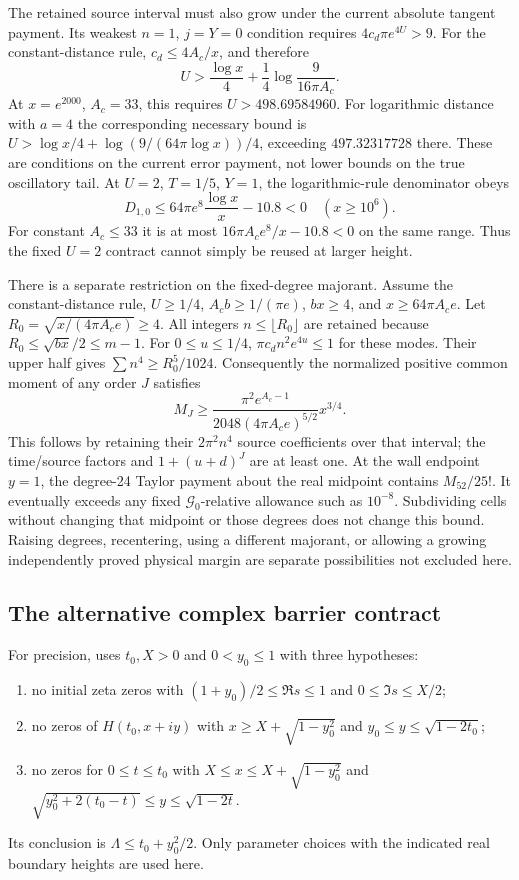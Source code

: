 The retained source interval must also grow under the current
absolute tangent payment. Its weakest $n=1$, $j=Y=0$ condition
requires $4c_d\pi e^{4U}>9$. For the constant-distance rule,
$c_d\le4A_c/x$, and therefore
\begin{equation}\label{eq:source-growth}
 U>\frac{\log x}{4}+
       \frac14\log\frac9{16\pi A_c}.
\end{equation}
At $x=e^{2000}$, $A_c=33$, this requires $U>498.69584960$.
For logarithmic distance with $a=4$ the corresponding necessary
bound is $U>\log x/4+\log(9/(64\pi\log x))/4$, exceeding
$497.32317728$ there. These are conditions on the current error
payment, not lower bounds on the true oscillatory tail.
At $U=2$, $T=1/5$, $Y=1$, the logarithmic-rule denominator obeys
\[
 D_{1,0}\le64\pi e^8\frac{\log x}{x}-10.8<0
 \quad(x\ge10^6).
\]
For constant $A_c\le33$ it is at most
$16\pi A_c e^8/x-10.8<0$ on the same range. Thus the fixed
$U=2$ contract cannot simply be reused at larger height.

There is a separate restriction on the fixed-degree majorant.
Assume the constant-distance rule, $U\ge1/4$,
$A_cb\ge1/(\pi e)$, $bx\ge4$, and $x\ge64\pi A_ce$.
Let $R_0=\sqrt{x/(4\pi A_ce)}\ge4$.
All integers $n\le\lfloor R_0\rfloor$ are retained because
$R_0\le\sqrt{bx}/2\le m-1$.
For $0\le u\le1/4$,
$\pi c_dn^2e^{4u}\le1$ for these modes.
Their upper half gives $\sum n^4\ge R_0^5/1024$.
Consequently the normalized positive common moment of any order $J$
satisfies
\begin{equation}\label{eq:moment-growth}
 M_J\ge
 \frac{\pi^2e^{A_c-1}}{2048(4\pi A_ce)^{5/2}}x^{3/4}.
\end{equation}
This follows by retaining their $2\pi^2n^4$ source coefficients
over that interval; the time/source factors and
$1+(u+d)^J$ are at least one.
At the wall endpoint $y=1$, the degree-24 Taylor payment about
the real midpoint contains $M_{52}/25!$. It eventually exceeds
any fixed $\mathcal G_0$-relative allowance such as $10^{-8}$.
Subdividing cells without changing that midpoint or those degrees
does not change this bound. Raising degrees, recentering, using a
different majorant, or allowing a growing independently proved
physical margin are separate possibilities not excluded here.

\subsection{The alternative complex barrier contract}

For precision, \cite[Theorem 1.2]{Polymath} uses $t_0,X>0$ and
$0<y_0\le1$ with three hypotheses:
\begin{enumerate}
\item no initial zeta zeros with $(1+y_0)/2\le\Re s\le1$
and $0\le\Im s\le X/2$;
\item no zeros of $H(t_0,x+iy)$ with
$x\ge X+\sqrt{1-y_0^2}$ and
$y_0\le y\le\sqrt{1-2t_0}$;
\item no zeros for $0\le t\le t_0$ with
$X\le x\le X+\sqrt{1-y_0^2}$ and
$\sqrt{y_0^2+2(t_0-t)}\le y\le\sqrt{1-2t}$.
\end{enumerate}
Its conclusion is $\Lambda\le t_0+y_0^2/2$.
Only parameter choices with the indicated real boundary heights
are used here.

